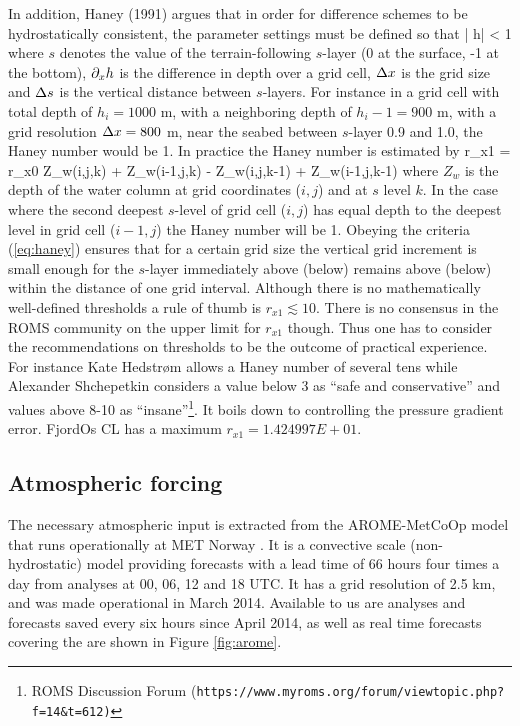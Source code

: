 In addition, Haney (1991) argues that in order for difference schemes to be hydrostatically
consistent, the parameter settings must be defined so that
\be
\label{eq:haney}
 \left|  \px h\right|\frac{\Dx}{\Ds} < 1
\ee
where $s$ denotes the value of the terrain-following $s$-layer (0 at the surface, -1 at the bottom), $\partial_x h$ is the difference in depth over a grid cell, $\Delta x$ is the grid size and $\Delta s$ is the vertical distance between $s$-layers. For instance in a grid cell with total depth of $h_i=1000$ m, with a neighboring depth of $h_i-1=900$ m, with a grid resolution $\Delta x=800$ m, near the seabed between $s$-layer 0.9 and 1.0, the Haney number would be 1. In practice the Haney number is estimated by
\be
 r_{x1} = r_{x0}
                     {Z_w(i,j,k) + Z_w(i-1,j,k) - Z_w(i,j,k-1) + Z_w(i-1,j,k-1)}
\ee
where $Z_w$ is the depth of the water column at grid coordinates ($i,j$) and at $s$ level $k$. In the case where the second deepest $s$-level of grid cell ($i,j$) has equal depth to the deepest level in grid cell ($i-1,j$) the Haney number will be 1. Obeying the criteria (\ref{eq:haney}) ensures that for a certain grid size the vertical grid increment is small enough for the $s$-layer immediately above (below) remains above (below) within the distance of one grid interval. Although there is no mathematically well-defined thresholds a rule of thumb is $r_{x1} \lesssim 10$. There is no consensus in the ROMS community on the upper limit for $r_{x1}$ though. Thus one has to consider the recommendations on thresholds to be the outcome of practical experience. For instance Kate Hedstr{\o}m allows a Haney number of several tens while Alexander Shchepetkin considers a value below 3 as ``safe and conservative'' and values above 8-10 as ``insane''\footnote{ROMS Discussion Forum (\texttt{https://www.myroms.org/forum/viewtopic.php?f=14\&t=612)}}. It boils down to controlling the pressure gradient error. FjordOs CL has a maximum $r_{x1} = 1.424997E+01$. %

\subsection{Atmospheric forcing}
\label{subsec:atmos}
The necessary atmospheric input is extracted from the AROME-MetCoOp model that runs operationally at MET Norway \citep{mulle:etal:2015}. It is a convective scale (non-hydrostatic) model providing forecasts with a lead time of 66 hours four times a day from analyses at 00, 06, 12 and 18 UTC. It has a grid resolution of 2.5 km, and was made operational in March 2014. Available to us are analyses and forecasts saved every six hours since April 2014, as well as real time forecasts covering the are shown in Figure \ref{fig:arome}.


